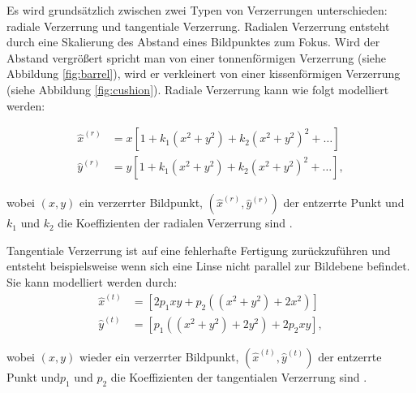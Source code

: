 Es wird grundsätzlich zwischen zwei Typen von Verzerrungen unterschieden: radiale Verzerrung und tangentiale Verzerrung. Radialen Verzerrung entsteht durch eine Skalierung des Abstand eines Bildpunktes zum Fokus. Wird der Abstand vergrößert spricht man von einer tonnenförmigen Verzerrung (siehe Abbildung \ref{fig:barrel}), wird er verkleinert von einer kissenförmigen Verzerrung (siehe Abbildung \ref{fig:cushion}).
Radiale Verzerrung kann wie folgt modelliert werden:

\[
\begin{aligned}
\hat{x}^{(r)} &= x\left[1 + k_1\left(x^2 + y^2\right) + k_2\left(x^2 + y^2\right)^2 + \dotsc\right] \\
\hat{y}^{(r)} &= y\left[1 + k_1\left(x^2 + y^2\right) + k_2\left(x^2 + y^2\right)^2 + \dotsc\right],
\end{aligned}
\]

wobei $(x,y)$ ein verzerrter Bildpunkt, $(\hat{x}^{(r)}, \hat{y}^{(r)})$ der entzerrte Punkt und $k_1$ und $k_2$ die Koeffizienten der radialen Verzerrung sind \cite{Zhang2002}.

Tangentiale Verzerrung ist auf eine fehlerhafte Fertigung zurückzuführen und entsteht beispielsweise wenn sich eine Linse nicht parallel zur Bildebene befindet. 
Sie kann modelliert werden durch:
\[
\begin{aligned}
\hat{x}^{(t)} &= \left[2p_1xy + p_2\left((x^2 + y^2) + 2x^2\right)\right] \\
\hat{y}^{(t)} &= \left[p_1\left((x^2 + y^2) + 2y^2\right) + 2p_2xy\right],
\end{aligned}
\]

wobei $(x,y)$ wieder ein verzerrter Bildpunkt, $(\hat{x}^{(t)}, \hat{y}^{(t)})$ der entzerrte Punkt und$p_1$ und $p_2$ die Koeffizienten der tangentialen Verzerrung sind \cite{Heikkila1997}.

